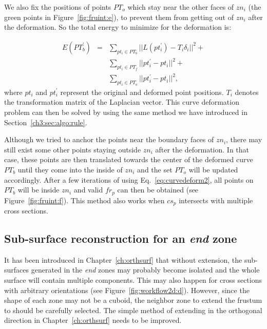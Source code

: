 We also fix the positions of points $PT_o$ which stay near the other
faces of $zn_i$ (the green points in Figure~\ref{fig:fruint:e}), to prevent
them from getting out of $zn_i$ after the deformation. So the total energy
to minimize for the deformation is:

\begin{eqnarray}
\label{eq:curvedeform2}
E(PT_b^\prime) &=& \sum\limits_{pt_i \in PT_b} {||L(pt_i^\prime)- T_i\delta_i||^2}+\nonumber\\
& & \sum\limits_{pt_i \in PT_f}{||pt_i^\prime-pt_i||^2}+\nonumber\\
& & \sum\limits_{pt_i \in PT_o}{||pt_i^\prime-pt_i||^2},
\end{eqnarray}
where $pt_i$ and $pt_i^\prime$ represent the original and deformed point positions.
$T_i$ denotes the transformation matrix of the Laplacian vector.
This curve deformation problem can then be solved by using the same method
we have introduced in Section~\ref{ch3:sec:algo:rule}.



Although we tried to  anchor the points near the boundary faces of
$zn_i$, there may still exist some other points staying outside
$zn_i$ after the deformation. In that case, these points are then
translated towards the center of the deformed curve $PT_b$ until
they come into the inside of $zn_i$ and the set $PT_o$ will be
updated accordingly. After a few iterations of using
Eq.~\ref{eq:curvedeform2}, all points on $PT_b$ will be inside $zn_i$
and valid $fr_p$ can then be obtained (see
Figure~\ref{fig:fruint:f}). This method also works when $cs_p$
intersects with multiple cross sections.



\subsection{Sub-surface reconstruction for an \textit{end} zone}
\label{ch6:sec:reconst:end}

It has been  introduced in Chapter~\ref{ch:orthsurf} that without
extension, the sub-surfaces generated in the \textit{end} zones may
probably become isolated and the whole surface will contain multiple
components. This may also happen for cross sections with arbitrary
orientations (see Figure~\ref{fig:workflow2d:d}). However, since the
shape of each zone may not be a cuboid,  the neighbor zone to extend
the frustum to should be carefully selected. The simple method of
extending in the orthogonal direction in Chapter~\ref{ch:orthsurf}
needs to be improved.

